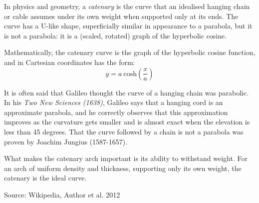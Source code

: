 \documentclass[11pt]{amsart}
\begin{document}
In physics and geometry, a \textit{catenary} is the curve that an idealised hanging chain or cable assumes under its own weight when supported only at its ends. The curve has a U-like shape, superficially similar in appearance to a parabola, but it is not a parabola: it is a (scaled, rotated) graph of the hyperbolic cosine. 

Mathematically, the catenary curve is the graph of the hyperbolic cosine function, and in Cartesian coordinates has the form:
\begin{equation}
y = a \: \mathrm{cosh}(\frac{x}{a})
\end{equation}

It is often said that Galileo thought the curve of a hanging chain was parabolic. In his \textit{Two New Sciences (1638)}, Galileo says that a hanging cord is an approximate parabola, and he correctly observes that this approximation improves as the curvature gets smaller and is almost exact when the elevation is less than 45 degrees. That the curve followed by a chain is not a parabola was proven by Joachim Jungius (1587-1657).

What makes the catenary arch important is its ability to withstand weight. For an arch of uniform density and thickness, supporting only its own weight, the catenary is the ideal curve.

Source: Wikipedia, Author et al. 2012
\end{document}
